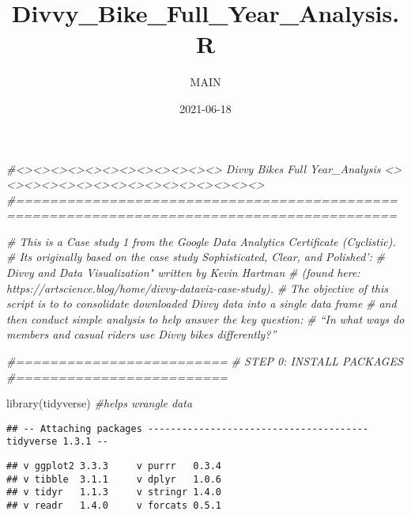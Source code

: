 \documentclass[
]{article}
\title{Divvy\_Bike\_Full\_Year\_Analysis.R}
\author{MAIN}
\date{2021-06-18}
\newenvironment{Shaded}{\begin{snugshade}}{\end{snugshade}}
\newcommand{\CommentTok}[1]{\textcolor[rgb]{0.56,0.35,0.01}{\textit{#1}}}
\newcommand{\FunctionTok}[1]{\textcolor[rgb]{0.00,0.00,0.00}{#1}}
\newcommand{\NormalTok}[1]{#1}
\begin{document}
\maketitle

\begin{Shaded}
\begin{Highlighting}[]
\CommentTok{\#\textless{}\textgreater{}\textless{}\textgreater{}\textless{}\textgreater{}\textless{}\textgreater{}\textless{}\textgreater{}\textless{}\textgreater{}\textless{}\textgreater{}\textless{}\textgreater{}\textless{}\textgreater{}\textless{}\textgreater{}\textless{}\textgreater{}\textless{}\textgreater{}   Divvy Bikes Full Year\_Analysis  \textless{}\textgreater{}\textless{}\textgreater{}\textless{}\textgreater{}\textless{}\textgreater{}\textless{}\textgreater{}\textless{}\textgreater{}\textless{}\textgreater{}\textless{}\textgreater{}\textless{}\textgreater{}\textless{}\textgreater{}\textless{}\textgreater{}\textless{}\textgreater{}\textless{}\textgreater{}\textless{}\textgreater{}\textless{}\textgreater{}\textless{}\textgreater{}}
\CommentTok{\#===========================================================================================}

\CommentTok{\# This is a Case study 1 from the Google Data Analytics Certificate (Cyclistic).}
\CommentTok{\# It\textquotesingle{}s originally based on the case study \textquotesingle{}Sophisticated, Clear, and Polished’: }
\CommentTok{\# Divvy and Data Visualization" written by Kevin Hartman}
\CommentTok{\# (found here: https://artscience.blog/home/divvy{-}dataviz{-}case{-}study). }
\CommentTok{\# The objective of this script is to to consolidate downloaded Divvy data into a single data frame }
\CommentTok{\# and then conduct simple analysis to help answer the key question: }
\CommentTok{\# “In what ways do members and casual riders use Divvy bikes differently?”}

\CommentTok{\#=========================}
\CommentTok{\# STEP 0: INSTALL PACKAGES}
\CommentTok{\#=========================}

\FunctionTok{library}\NormalTok{(tidyverse)  }\CommentTok{\#helps wrangle data}
\end{Highlighting}
\end{Shaded}

\begin{verbatim}
## -- Attaching packages --------------------------------------- tidyverse 1.3.1 --
\end{verbatim}

\begin{verbatim}
## v ggplot2 3.3.3     v purrr   0.3.4
## v tibble  3.1.1     v dplyr   1.0.6
## v tidyr   1.1.3     v stringr 1.4.0
## v readr   1.4.0     v forcats 0.5.1
\end{verbatim}
\end{document}
